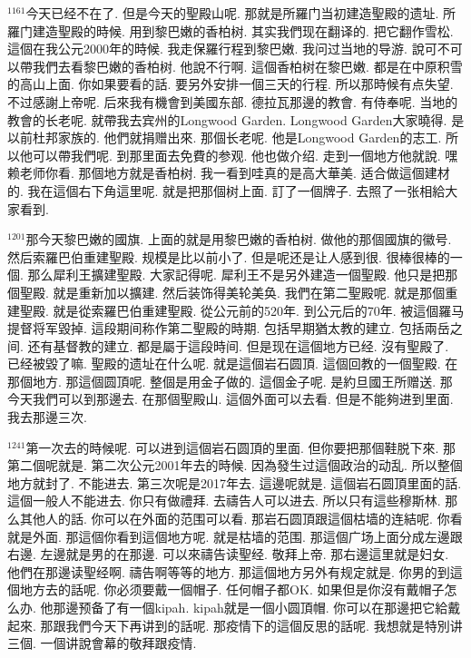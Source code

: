 \documentclass{book}
\begin{document}
$^{1161}$今天已经不在了.
但是今天的聖殿山呢.
那就是所羅门当初建造聖殿的遗址.
所羅门建造聖殿的時候.
用到黎巴嫩的香柏树.
其实我們现在翻译的.
把它翻作雪松.
這個在我公元2000年的時候.
我走保羅行程到黎巴嫩.
我问过当地的导游.
說可不可以帶我們去看黎巴嫩的香柏树.
他說不行啊.
這個香柏树在黎巴嫩.
都是在中原积雪的高山上面.
你如果要看的話.
要另外安排一個三天的行程.
所以那時候有点失望.
不过感謝上帝呢.
后來我有機會到美國东部.
德拉瓦那邊的教會.
有侍奉呢.
当地的教會的长老呢.
就帶我去宾州的Longwood Garden.
Longwood Garden大家曉得.
是以前杜邦家族的.
他們就捐赠出來.
那個长老呢.
他是Longwood Garden的志工.
所以他可以帶我們呢.
到那里面去免費的参观.
他也做介绍.
走到一個地方他就說.
嘿赖老师你看.
那個地方就是香柏树.
我一看到哇真的是高大華美.
适合做這個建材的.
我在這個右下角這里呢.
就是把那個树上面.
訂了一個牌子.
去照了一张相給大家看到.

$^{1201}$那今天黎巴嫩的國旗.
上面的就是用黎巴嫩的香柏树.
做他的那個國旗的徽号.
然后索羅巴伯重建聖殿.
规模是比以前小了.
但是呢还是让人感到很.
很棒很棒的一個.
那么犀利王擴建聖殿.
大家記得呢.
犀利王不是另外建造一個聖殿.
他只是把那個聖殿.
就是重新加以擴建.
然后装饰得美轮美奂.
我們在第二聖殿呢.
就是那個重建聖殿.
就是從索羅巴伯重建聖殿.
從公元前的520年.
到公元后的70年.
被這個羅马提督将军毀掉.
這段期间称作第二聖殿的時期.
包括早期猶太教的建立.
包括兩岳之间.
还有基督教的建立.
都是屬于這段時间.
但是现在這個地方已经.
沒有聖殿了.
已经被毀了嘛.
聖殿的遗址在什么呢.
就是這個岩石圆頂.
這個回教的一個聖殿.
在那個地方.
那這個圆頂呢.
整個是用金子做的.
這個金子呢.
是約旦國王所赠送.
那今天我們可以到那邊去.
在那個聖殿山.
這個外面可以去看.
但是不能夠进到里面.
我去那邊三次.

$^{1241}$第一次去的時候呢.
可以进到這個岩石圆頂的里面.
但你要把那個鞋脱下來.
那第二個呢就是.
第二次公元2001年去的時候.
因為發生过這個政治的动乱.
所以整個地方就封了.
不能进去.
第三次呢是2017年去.
這邊呢就是.
這個岩石圆頂里面的話.
這個一般人不能进去.
你只有做禮拜.
去禱告人可以进去.
所以只有這些穆斯林.
那么其他人的話.
你可以在外面的范围可以看.
那岩石圆頂跟這個枯墙的连結呢.
你看就是外面.
那這個你看到這個地方呢.
就是枯墙的范围.
那這個广场上面分成左邊跟右邊.
左邊就是男的在那邊.
可以來禱告读聖经.
敬拜上帝.
那右邊這里就是妇女.
他們在那邊读聖经啊.
禱告啊等等的地方.
那這個地方另外有规定就是.
你男的到這個地方去的話呢.
你必须要戴一個帽子.
任何帽子都OK.
如果但是你沒有戴帽子怎么办.
他那邊预备了有一個kipah.
kipah就是一個小圆頂帽.
你可以在那邊把它給戴起來.
那跟我們今天下再讲到的話呢.
那疫情下的這個反思的話呢.
我想就是特別讲三個.
一個讲說會幕的敬拜跟疫情.
\end{document}
